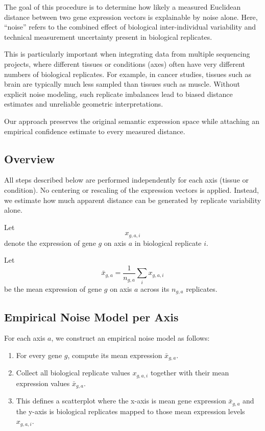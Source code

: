 \documentclass{article}
\begin{document}
The goal of this procedure is to determine how likely a measured Euclidean distance between two gene expression vectors is explainable by noise alone. Here, ``noise'' refers to the combined effect of biological inter-individual variability and technical measurement uncertainty present in biological replicates.

This is particularly important when integrating data from multiple sequencing projects, where different tissues or conditions (axes) often have very different numbers of biological replicates. For example, in cancer studies, tissues such as brain are typically much less sampled than tissues such as muscle. Without explicit noise modeling, such replicate imbalances lead to biased distance estimates and unreliable geometric interpretations.

Our approach preserves the original semantic expression space while attaching an empirical confidence estimate to every measured distance.

\subsection{Overview}

All steps described below are performed independently for each axis (tissue or condition). No centering or rescaling of the expression vectors is applied. Instead, we estimate how much apparent distance can be generated by replicate variability alone.

Let
\[
x_{g,a,i}
\]
denote the expression of gene $g$ on axis $a$ in biological replicate $i$.

Let
\[
\bar{x}_{g,a} = \frac{1}{n_{g,a}} \sum_i x_{g,a,i}
\]
be the mean expression of gene $g$ on axis $a$ across its $n_{g,a}$ replicates.

\subsection{Empirical Noise Model per Axis}

For each axis $a$, we construct an empirical noise model as follows:

\begin{enumerate}
\item For every gene $g$, compute its mean expression $\bar{x}_{g,a}$.
\item Collect all biological replicate values $x_{g,a,i}$ together with their mean expression values $\bar{x}_{g,a}$.
\item This defines a scatterplot where the x-axis is mean gene expression $\bar{x}_{g,a}$ and the y-axis is biological replicates mapped to those mean expression levels $x_{g,a,i}$.
\end{enumerate}
\end{document}

